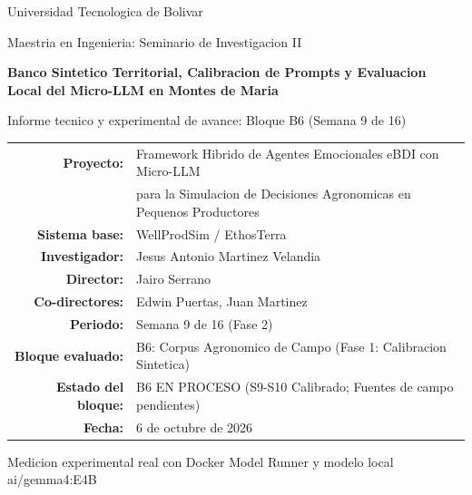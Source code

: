 \documentclass[11pt,a4paper]{article}
\begin{document}
\begin{titlepage}
    \centering
    \vspace*{1.2cm}

    {\large Universidad Tecnologica de Bolivar\par}
    \vspace{0.3cm}
    {\normalsize Maestria en Ingenieria: Seminario de Investigacion II\par}

    \vspace{2.0cm}
    {\LARGE\bfseries Banco Sintetico Territorial, Calibracion de Prompts y Evaluacion Local del Micro-LLM en Montes de Maria\par}
    \vspace{0.5cm}
    {\large Informe tecnico y experimental de avance: Bloque B6 (Semana 9 de 16)\par}

    \vspace{2.0cm}
    \begin{tabular}{rl}
        \textbf{Proyecto:} & Framework Hibrido de Agentes Emocionales eBDI con Micro-LLM \\
                           & para la Simulacion de Decisiones Agronomicas en Pequenos Productores \\
        \textbf{Sistema base:} & WellProdSim / EthosTerra \\
        \textbf{Investigador:} & Jesus Antonio Martinez Velandia \\
        \textbf{Director:} & Jairo Serrano \\
        \textbf{Co-directores:} & Edwin Puertas, Juan Martinez \\
        \textbf{Periodo:} & Semana 9 de 16 (Fase 2) \\
        \textbf{Bloque evaluado:} & B6: Corpus Agronomico de Campo (Fase 1: Calibracion Sintetica) \\
        \textbf{Estado del bloque:} & B6 EN PROCESO (S9-S10 Calibrado; Fuentes de campo pendientes) \\
        \textbf{Fecha:} & 6 de octubre de 2026 \\
    \end{tabular}

    \vfill
    {\small Medicion experimental real con Docker Model Runner y modelo local ai/gemma4:E4B\par}
    \vspace*{0.8cm}
\end{titlepage}
\end{document}
